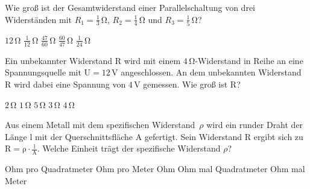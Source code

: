 \documentclass[11pt]{exam}
\begin{document}
\setlength{\voffset}{-0.5in}
\setlength{\headsep}{5pt}

\hspace{2mm}
 \hspace{5mm}
\vspace{4mm}

\begin{questions}

\question Wie groß ist der Gesamtwiderstand einer Parallelschaltung von drei Widerständen mit \(R_1=\mathrm{\frac{1}{3}\,\Omega}\), \(R_2=\mathrm{\frac{1}{4}\,\Omega}\) und \(R_3=\mathrm{\frac{1}{5}\,\Omega}\)?

\begin{choices}
	\choice \(\mathrm{12\,\Omega}\)
	\choice \(\mathrm{\frac{1}{12}\,\Omega}\)
	\choice \(\mathrm{\frac{47}{60}\,\Omega}\)
	\choice \(\mathrm{\frac{60}{47}\,\Omega}\)
	\choice \(\mathrm{\frac{1}{24}\,\Omega}\)
\end{choices}

\vspace{3mm}\question Ein unbekannter Widerstand \(\mathrm{R}\) wird mit einem \(\mathrm{4\,\Omega}\)-Widerstand in Reihe an eine Spannungsquelle mit \(\mathrm{U=12\,V}\) angeschlossen. An dem unbekannten Widerstand \(\mathrm{R}\) wird dabei eine Spannung von \(\mathrm{4\,V}\) gemessen. Wie groß ist \(\mathrm{R}\)?

\begin{choices}
	\choice \(\mathrm{2\,\Omega}\)
	\choice \(\mathrm{1\,\Omega}\)
	\choice \(\mathrm{5\,\Omega}\)
	\choice \(\mathrm{3\,\Omega}\)
	\choice \(\mathrm{4\,\Omega}\)
\end{choices}

\vspace{3mm}\question Aus einem Metall mit dem spezifischen Widerstand \(\rho\) wird ein runder Draht der Länge \(\mathrm{l}\) mit der Querschnittsfläche \(\mathrm{A}\) gefertigt. Sein Widerstand \(\mathrm{R}\) ergibt sich zu \(\mathrm{R=\rho \cdot \frac{l}{A}}\). Welche Einheit trägt der spezifische Widerstand \(\rho\)?

\begin{choices}
	\choice Ohm pro Quadratmeter
	\choice Ohm pro Meter
	\choice Ohm
	\choice Ohm mal Quadratmeter
	\choice Ohm mal Meter
\end{choices}


\end{questions}
\end{document}
